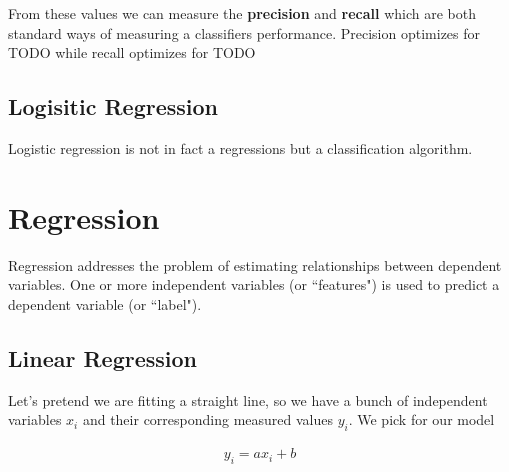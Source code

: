 From these values we can measure the \textbf{precision} and \textbf{recall} which are both standard ways of measuring a classifiers performance. Precision optimizes for TODO while recall optimizes for TODO

\subsection{Logisitic Regression}
Logistic regression is not in fact a regressions but a classification algorithm.

\section{Regression}
Regression addresses the problem of estimating relationships between dependent variables. One or more independent variables (or ``features") is used to predict a dependent variable (or ``label").

\subsection{Linear Regression}\label{least-squares}
Let's pretend we are fitting a straight line, so we have a bunch of independent variables $x_i$ and their corresponding measured values $y_i$. We pick for our model

\begin{align}
y_i = ax_i + b
\end{align}


